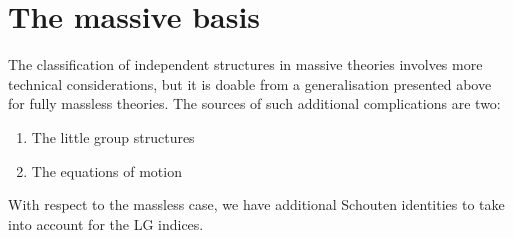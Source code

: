 \documentclass[aps,prd,nofootinbib,twocolumn,10pt]{revtex4-2}
\begin{document}
\section{The massive basis}

The classification of independent structures in massive theories involves more technical considerations, but it is doable from a generalisation presented above for fully massless theories. The sources of such additional complications are two:
\begin{enumerate}
	\item The little group structures
	\item The equations of motion
\end{enumerate}
With respect to the massless case, we have additional Schouten identities to take into account for the LG indices.
\end{document}

